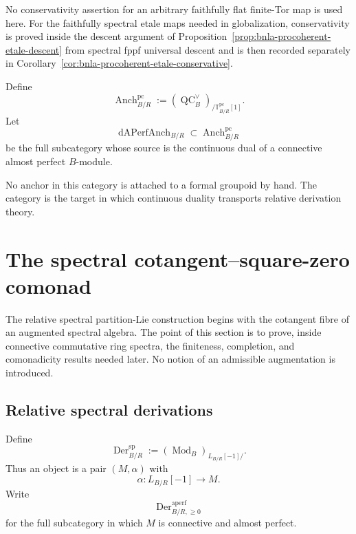 \begin{remark}
\label{rem:bnla-procoherent-conservativity-from-descent}
No conservativity assertion for an arbitrary faithfully flat finite-Tor map is
used here.  For the faithfully spectral etale maps needed in globalization,
conservativity is proved inside the descent argument of
Proposition~\ref{prop:bnla-procoherent-etale-descent} from spectral fppf
universal descent and is then recorded separately in
Corollary~\ref{cor:bnla-procoherent-etale-conservative}.
\end{remark}


\begin{definition}
\label{def:bnla-spectral-anchor-category}
Define
\[
    \operatorname{Anch}^{\mathrm{pc}}_{B/R}
    :=
    \left(
        \operatorname{QC}^{\vee}_B
    \right)_{/\mathbb T^{\mathrm{pc}}_{B/R}[1]}.
\]
Let
\[
    \operatorname{dAPerfAnch}_{B/R}
    \subset
    \operatorname{Anch}^{\mathrm{pc}}_{B/R}
\]
be the full subcategory whose source is the continuous dual of a connective
almost perfect $B$-module.
\end{definition}

No anchor in this category is attached to a formal groupoid by hand.  The
category is the target in which continuous duality transports relative
derivation theory.
\section{The spectral cotangent--square-zero comonad}
\label{sec:bnla-spectral-cot-sqz}

The relative spectral partition-Lie construction begins with the cotangent
fibre of an augmented spectral algebra.  The point of this section is to prove,
inside connective commutative ring spectra, the finiteness, completion, and
comonadicity results needed later.  No notion of an admissible augmentation is
introduced.

\subsection{Relative spectral derivations}

\begin{definition}
\label{def:bnla-spectral-derivation-category}
Define
\[
    \operatorname{Der}^{\mathrm{sp}}_{B/R}
    :=
    \left(\operatorname{Mod}_B\right)_{L_{B/R}[-1]/}.
\]
Thus an object is a pair $(M,\alpha)$ with
\[
    \alpha:L_{B/R}[-1]\longrightarrow M.
\]
Write
\[
    \operatorname{Der}^{\mathrm{aperf}}_{B/R,\geq0}
\]
for the full subcategory in which $M$ is connective and almost perfect.
\end{definition}

